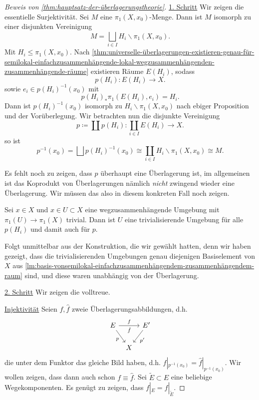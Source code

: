 \begin{proof}[Beweis von \autoref{thm:hauptsatz-der-überlagerungstheorie}]
    \underline{1. Schritt} Wir zeigen die essentielle Surjektivität. Sei $M$ eine  $\pi_1(X,x_0)$-Menge. Dann ist $M$ isomorph zu einer disjunkten Vereinigung
    \[
        M = \bigsqcup_{i\in I} H_i \backslash \pi_1(X,x_0)
    .\] 
    Mit $H_i \leq  \pi_1(X,x_0)$. Nach \autoref{thm:universelle-überlagerungen-existieren-genau-für-semilokal-einfachzusammenhängende-lokal-wegzusammenhängenden-zusammenhängende-räume} existieren Räume $E(H_i)$, sodass
     \[
         p(H_i) \colon  E(H_i) \to  X
    .\] 
    sowie $e_i\in p(H_i)^{-1}(x_0)$ mit 
    \[
        p(H_i)_* \pi_1(E(H_i),e_i) = H_i
    .\] 
    Dann ist $p(H_i)^{-1}(x_0)$ isomorph zu $H_i \backslash \pi_1(X,x_0)$ nach ebiger Proposition und der Vorüberlegung. Wir betrachten nun die disjunkte Vereinigung
    \[
        p\coloneqq  \coprod p(H_i) \colon  \coprod _{i \in I} E(H_i) \to  X
    .\] 
    so ist
    \[
        p^{-1} (x_0) = \bigsqcup p(H_i)^{-1}(x_0) \cong \coprod_{i \in I} H_i \backslash \pi_1(X,x_0) \cong M
    .\] 
    \begin{remark}
        Es fehlt noch zu zeigen, dass $p$ überhaupt eine Überlagerung ist, im allgemeinen ist das Koprodukt von Überlagerungen nämlich \textit{nicht} zwingend wieder eine Überlagerung. Wir müssen das also in diesem konkreten Fall noch zeigen.
    \end{remark}
    \begin{claim}
        Sei $x\in X$ und $x\in U\subset X$ eine wegzusammenhängende Umgebung mit $\pi_1(U) \to  \pi_1(X)$ trivial. Dann ist $U$ eine trivialisierende Umgebung für alle  $p(H_i)$ und damit auch für  $p$.
    \end{claim}
    \begin{subproof}
        Folgt unmittelbar aus der Konstruktion, die wir gewählt hatten, denn wir haben gezeigt, dass die trivialisierenden Umgebungen genau diejenigen Basiselement von $X$ aus  \autoref{lm:basis-vonsemilokal-einfachzusammenhängendem-zusammenhängendem-raum} sind, und diese waren unabhängig von der Überlagerung.
    \end{subproof}
    \underline{2. Schritt} Wir zeigen die volltreue.

    \underline{Injektivität} Seien $f,\hat{f}$ zweie Überlagerungsabbildungen, d.h.
    \[
    \begin{tikzcd}[column sep = tiny]
        E \ar{rr}{f}[swap]{\hat{f}} \ar[swap]{dr}{p} & & E' \ar{dl}{p'} \\
    & X
    \end{tikzcd}
    \]
    die unter dem Funktor das gleiche Bild haben, d.h. $f|_{p^{-1} (x_0)} = \hat{f}|_{p^{-1} (x_0)}$. Wir wollen zeigen, dass dann auch schon $f \equiv  \hat{f}$. Sei $\tilde{E} \subset E$ eine beliebige Wegekomponenten. Es genügt zu zeigen, dass $f|_E = \hat{f}|_{\tilde{E}}$.


\end{proof}
